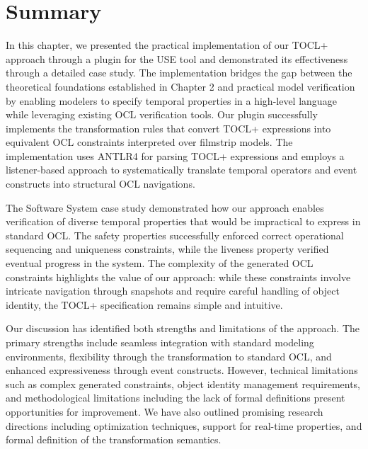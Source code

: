 \section{Summary}
\hspace{1cm} In this chapter, we presented the practical implementation of our TOCL+ 
approach through a plugin for the USE tool and demonstrated its effectiveness through 
a detailed case study. The implementation bridges the gap between the theoretical 
foundations established in Chapter 2 and practical model verification by enabling 
modelers to specify temporal properties in a high-level language while leveraging 
existing OCL verification tools. Our plugin successfully implements the transformation 
rules that convert TOCL+ expressions into equivalent OCL constraints interpreted 
over filmstrip models. The implementation uses ANTLR4 for parsing TOCL+ expressions 
and employs a listener-based approach to systematically translate temporal operators 
and event constructs into structural OCL navigations.

The Software System case study demonstrated how our approach enables verification 
of diverse temporal properties that would be impractical to express in standard OCL. 
The safety properties successfully enforced correct operational sequencing and 
uniqueness constraints, while the liveness property verified eventual progress in 
the system. The complexity of the generated OCL constraints highlights the value of 
our approach: while these constraints involve intricate navigation through snapshots 
and require careful handling of object identity, the TOCL+ specification remains 
simple and intuitive.

Our discussion has identified both strengths and limitations of the approach. 
The primary strengths include seamless integration with standard modeling environments,
flexibility through the transformation to standard OCL, and enhanced expressiveness 
through event constructs. However, technical limitations such as complex generated 
constraints, object identity management requirements, and methodological limitations 
including the lack of formal definitions present opportunities for improvement. 
We have also outlined promising research directions including optimization techniques, 
support for real-time properties, and formal definition of the transformation semantics.

